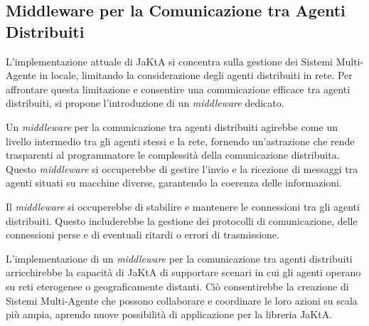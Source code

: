\subsection{Middleware per la Comunicazione tra Agenti Distribuiti}

L'implementazione attuale di JaKtA si concentra sulla gestione dei Sistemi Multi-Agente in locale, limitando la considerazione degli agenti distribuiti in rete. Per affrontare questa limitazione e consentire una comunicazione efficace tra agenti distribuiti, si propone l'introduzione di un \textit{middleware} dedicato.

Un \textit{middleware} per la comunicazione tra agenti distribuiti agirebbe come un livello intermedio tra gli agenti stessi e la rete, fornendo un'astrazione che rende trasparenti al programmatore le complessità della comunicazione distribuita. Questo \textit{middleware} si occuperebbe di gestire l'invio e la ricezione di messaggi tra agenti situati su macchine diverse, garantendo la coerenza delle informazioni.

Il \textit{middleware} si occuperebbe di stabilire e mantenere le connessioni tra gli agenti distribuiti. Questo includerebbe la gestione dei protocolli di comunicazione, delle connessioni perse e di eventuali ritardi o errori di trasmissione.

L'implementazione di un \textit{middleware} per la comunicazione tra agenti distribuiti arricchirebbe la capacità di JaKtA di supportare scenari in cui gli agenti operano su reti eterogenee o geograficamente distanti. Ciò consentirebbe la creazione di Sistemi Multi-Agente che possono collaborare e coordinare le loro azioni su scala più ampia, aprendo nuove possibilità di applicazione per la libreria JaKtA.